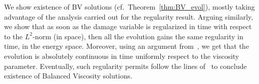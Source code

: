 \documentclass[reqno]{amsart}
\theoremstyle{definition}
\numberwithin{equation}{section}
\begin{document}



We show existence of BV solutions (cf.\ Theorem~\ref{thm:BV_evol}), mostly taking advantage of the analysis carried out for the regularity result. Arguing similarly, we show that as soon as the damage variable is regularized in time with respect to the $L^2$-norm (in space), then all the evolution gains the same regularity in time, in the energy space.
Moreover, using an argument from~\cite{KRZ, CrLa}, we get that the evolution is absolutely continuous in time uniformly respect to the viscosity parameter.
Eventually, such regularity permits follow the lines of~\cite{CrLa} to conclude existence of Balanced Viscosity solutions. 
\end{document}
